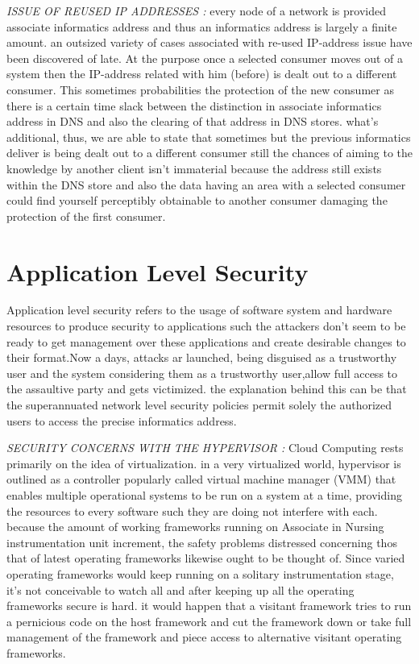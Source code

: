 \textit{ISSUE OF REUSED IP ADDRESSES :} every node of a network is provided
associate informatics address and thus an informatics address is largely a finite amount. an outsized variety of cases associated with re-used IP-address issue
have been discovered of late. At the purpose once a selected consumer moves out
of a system then the IP-address related with him (before) is dealt out to a different consumer. This sometimes probabilities the protection of the
new consumer as there is a certain time slack between the distinction in associate
informatics address in DNS and also the clearing of that address in DNS stores. what's additional, thus, we are able to state that sometimes but the previous informatics deliver is being dealt out to a different consumer still the chances of aiming to the knowledge by another client isn't immaterial because the address still exists within the DNS store and also the data having an area with a selected consumer could find yourself perceptibly obtainable to another consumer damaging the protection of the first consumer.
\section{Application Level Security}
Application level security refers to the usage of software system and hardware
resources to produce security to applications such the attackers don't seem to be ready to get management over these applications and create desirable changes to their format.Now a days, attacks ar launched, being disguised as a trustworthy user
and the system considering them as a trustworthy user,allow full access to the
assaultive party and gets victimized. the explanation behind this can be that the superannuated network level security policies permit solely the authorized users to access the precise informatics address.

\textit{SECURITY CONCERNS WITH THE HYPERVISOR :}
Cloud Computing rests primarily on the idea of virtualization. in a very virtualized world, hypervisor is outlined as a controller popularly called virtual
machine manager (VMM) that enables multiple operational systems to be run on a
system at a time, providing the resources to every software such they are doing not interfere with each. because the amount of working frameworks running on Associate in Nursing instrumentation unit increment, the safety problems distressed concerning thos that of latest operating frameworks likewise ought to be thought of. Since varied operating frameworks would keep running on a solitary instrumentation stage, it's not conceivable to watch all and after
keeping up all the operating frameworks secure is hard. it would happen that a visitant framework tries to run a pernicious code on the host framework and cut the framework down or take full management of the framework and piece access to alternative visitant operating frameworks.

